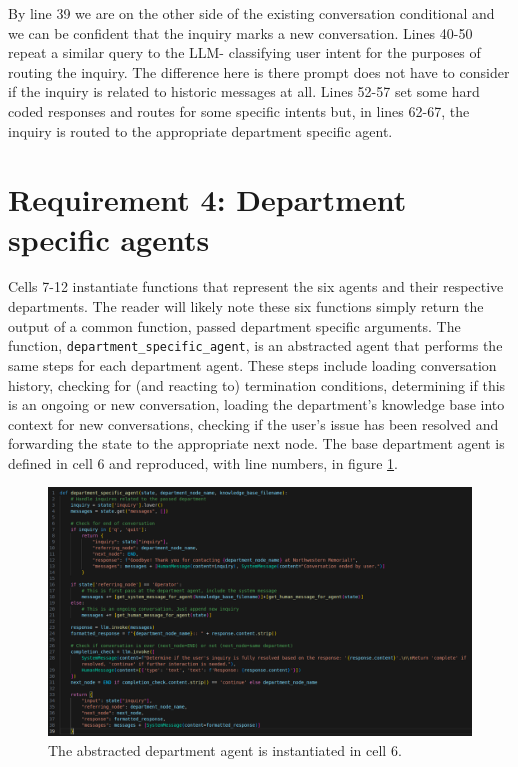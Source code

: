 \documentclass[11pt,letterpaper]{article}
\begin{document}
By line 39 we are on the other side of the existing conversation conditional and we can be confident that the inquiry marks a new conversation. Lines 40-50 repeat a similar query to the LLM- classifying user intent for the purposes of routing the inquiry. The difference here is there prompt does not have to consider if the inquiry is related to historic messages at all. Lines 52-57 set some hard coded responses and routes for some specific intents but, in lines 62-67, the inquiry is routed to the appropriate department specific agent.

\section*{Requirement 4: Department specific agents}
\tab Cells 7-12 instantiate functions that represent the six agents and their respective departments. 
The reader will likely note these six functions simply return the output of a common function, passed department specific arguments. The function, \texttt{department\_specific\_agent}, is an abstracted agent that performs the same steps for each department agent. These steps include loading conversation history, checking for (and reacting to) termination conditions, determining if this is an ongoing or new conversation, loading the department's knowledge base into context for new conversations, checking if the user's issue has been resolved and forwarding the state to the appropriate next node. The base department agent is defined in cell 6 and reproduced, with line numbers, in figure \ref{fig:dept_agent}.

\begin{figure}[h!]
    \centering
    \includegraphics[width=1.0\linewidth]{cell_06.png}
    \caption{The abstracted department agent is instantiated in cell 6.}
    \label{fig:dept_agent}
\end{figure}
\end{document}

